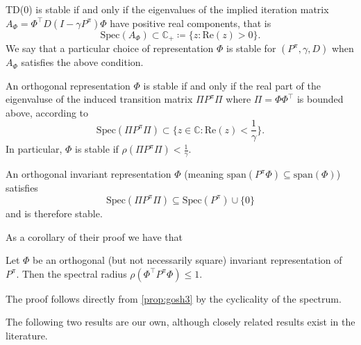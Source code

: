 \begin{lemma}\label{prop:gosh1}
    TD(0) is stable if and only if the eigenvalues of the implied iteration matrix $A_\Phi = \Phi^\top D (I - \gamma P^\pi) \Phi$ have positive real components, that is $$\text{Spec}\left(A_\Phi\right) \subset \mathbb{C}_+ \coloneq \{z : \text{Re}(z) > 0 \}.$$
    We say that a particular choice of representation $\Phi$ is stable for $(P^\pi, \gamma, D)$ when $A_\Phi$ satisfies the above condition.
\end{lemma}

\begin{lemma}\label{prop:gosh2}
    An orthogonal representation $\Phi$ is stable if and only if the real part of the eigenvaluse of the induced transition matrix $\Pi P^\pi \Pi$ where $\Pi = \Phi\Phi^\top$ is bounded above, according to $$\text{Spec}\left(\Pi P^\pi \Pi\right) \subset \{z \in \mathbb{C}: \text{Re}(z) < \frac{1}{\gamma} \}.$$
    In particular, $\Phi$ is stable if $\rho(\Pi P^\pi\Pi) < \frac{1}{\gamma}$.
\end{lemma}

\begin{lemma}\label{prop:gosh3}
    An orthogonal invariant representation $\Phi$ (meaning $\text{span}(P^\pi \Phi) \subseteq \text{span}(\Phi)$) satisfies $$\text{Spec}\left(\Pi P^\pi \Pi\right) \subseteq \text{Spec}(P^\pi) \cup \{0\}$$ and is therefore stable.
\end{lemma}

As a corollary of their proof we have that 

\begin{lemma}\label{gosh:corr}
    Let $\Phi$ be an orthogonal (but not necessarily square) invariant representation of $P^\pi$. Then the spectral radius $\rho(\Phi^\top P^\pi \Phi) \leq 1.$ 
\end{lemma}

The proof follows directly from \autoref{prop:gosh3} by the cyclicality of the spectrum.
    

The following two results are our own, although closely related results exist in the literature.

